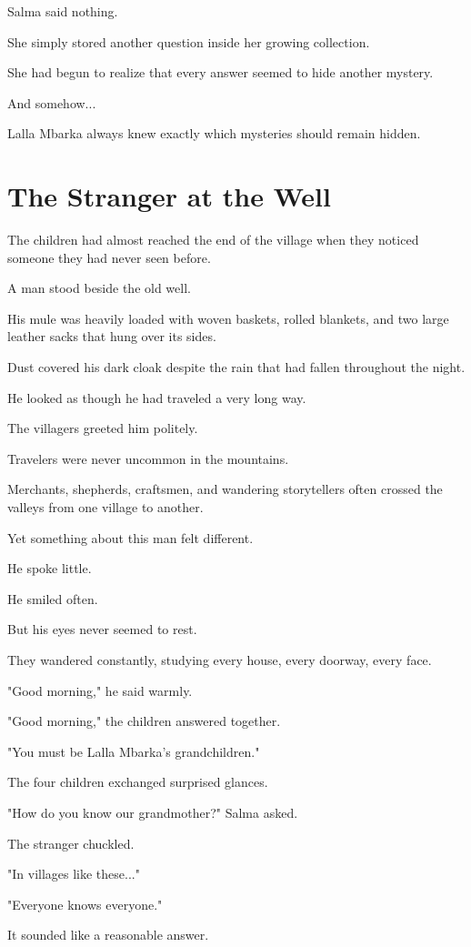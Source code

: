 \documentclass[12pt,openany]{book}
\begin{document}
Salma said nothing.

She simply stored another question inside her growing collection.

She had begun to realize that every answer seemed to hide another mystery.

And somehow...

Lalla Mbarka always knew exactly which mysteries should remain hidden.
\section*{The Stranger at the Well}

The children had almost reached the end of the village when they noticed someone they had never seen before.

A man stood beside the old well.

His mule was heavily loaded with woven baskets, rolled blankets, and two large leather sacks that hung over its sides.

Dust covered his dark cloak despite the rain that had fallen throughout the night.

He looked as though he had traveled a very long way.

The villagers greeted him politely.

Travelers were never uncommon in the mountains.

Merchants, shepherds, craftsmen, and wandering storytellers often crossed the valleys from one village to another.

Yet something about this man felt different.

He spoke little.

He smiled often.

But his eyes never seemed to rest.

They wandered constantly, studying every house, every doorway, every face.

"Good morning," he said warmly.

"Good morning," the children answered together.

"You must be Lalla Mbarka's grandchildren."

The four children exchanged surprised glances.

"How do you know our grandmother?" Salma asked.

The stranger chuckled.

"In villages like these..."

"Everyone knows everyone."

It sounded like a reasonable answer.
\end{document}
